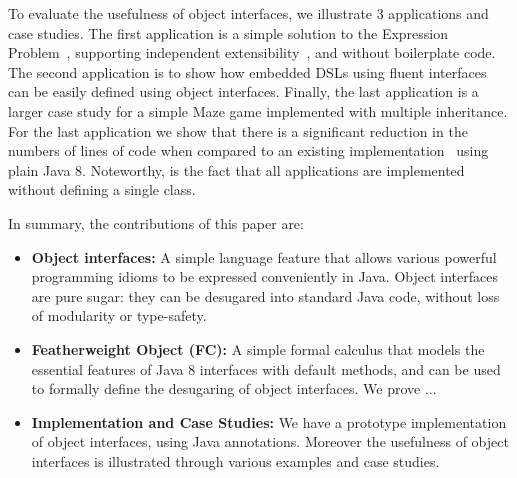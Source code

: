 To evaluate the usefulness of object interfaces, we illustrate 3
applications and case studies. The first application is a simple 
solution to the Expression Problem~\cite{}, supporting independent 
extensibility~\cite{}, and without boilerplate code. The second
application is to show how embedded DSLs using fluent interfaces~\cite{} 
can be easily defined using object interfaces. Finally, the last
application is a larger case study for a simple Maze game implemented with 
multiple inheritance. For the last application we show that there is a
significant reduction in the numbers of lines of code when compared 
to an existing implementation~\cite{} using plain Java 8. 
Noteworthy, is the fact that all applications are implemented 
without defining a single class.

In summary, the contributions of this paper are:

\begin{itemize}

\item {\bf Object interfaces:} A simple language feature that allows 
various powerful programming idioms to be expressed conveniently in
Java. Object interfaces are pure sugar: they can be desugared into standard Java 
code, without loss of modularity or type-safety. 

\item {\bf Featherweight Object (FC):} A simple formal calculus that models 
the essential features of Java 8 interfaces with default methods, and 
can be used to formally define the desugaring of object interfaces. 
We prove ...

\item {\bf Implementation and Case Studies:} We have a prototype implementation 
  of object interfaces, using Java annotations. Moreover the usefulness
  of object interfaces is illustrated through various examples and
  case studies.

\end{itemize}



